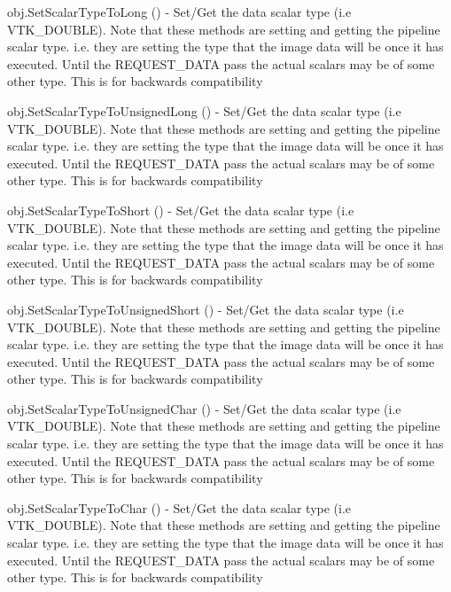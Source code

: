 \begin{DoxyItemize}
\item {\ttfamily obj.\-Set\-Scalar\-Type\-To\-Long ()} -\/ Set/\-Get the data scalar type (i.\-e V\-T\-K\-\_\-\-D\-O\-U\-B\-L\-E). Note that these methods are setting and getting the pipeline scalar type. i.\-e. they are setting the type that the image data will be once it has executed. Until the R\-E\-Q\-U\-E\-S\-T\-\_\-\-D\-A\-T\-A pass the actual scalars may be of some other type. This is for backwards compatibility  
\item {\ttfamily obj.\-Set\-Scalar\-Type\-To\-Unsigned\-Long ()} -\/ Set/\-Get the data scalar type (i.\-e V\-T\-K\-\_\-\-D\-O\-U\-B\-L\-E). Note that these methods are setting and getting the pipeline scalar type. i.\-e. they are setting the type that the image data will be once it has executed. Until the R\-E\-Q\-U\-E\-S\-T\-\_\-\-D\-A\-T\-A pass the actual scalars may be of some other type. This is for backwards compatibility  
\item {\ttfamily obj.\-Set\-Scalar\-Type\-To\-Short ()} -\/ Set/\-Get the data scalar type (i.\-e V\-T\-K\-\_\-\-D\-O\-U\-B\-L\-E). Note that these methods are setting and getting the pipeline scalar type. i.\-e. they are setting the type that the image data will be once it has executed. Until the R\-E\-Q\-U\-E\-S\-T\-\_\-\-D\-A\-T\-A pass the actual scalars may be of some other type. This is for backwards compatibility  
\item {\ttfamily obj.\-Set\-Scalar\-Type\-To\-Unsigned\-Short ()} -\/ Set/\-Get the data scalar type (i.\-e V\-T\-K\-\_\-\-D\-O\-U\-B\-L\-E). Note that these methods are setting and getting the pipeline scalar type. i.\-e. they are setting the type that the image data will be once it has executed. Until the R\-E\-Q\-U\-E\-S\-T\-\_\-\-D\-A\-T\-A pass the actual scalars may be of some other type. This is for backwards compatibility  
\item {\ttfamily obj.\-Set\-Scalar\-Type\-To\-Unsigned\-Char ()} -\/ Set/\-Get the data scalar type (i.\-e V\-T\-K\-\_\-\-D\-O\-U\-B\-L\-E). Note that these methods are setting and getting the pipeline scalar type. i.\-e. they are setting the type that the image data will be once it has executed. Until the R\-E\-Q\-U\-E\-S\-T\-\_\-\-D\-A\-T\-A pass the actual scalars may be of some other type. This is for backwards compatibility  
\item {\ttfamily obj.\-Set\-Scalar\-Type\-To\-Char ()} -\/ Set/\-Get the data scalar type (i.\-e V\-T\-K\-\_\-\-D\-O\-U\-B\-L\-E). Note that these methods are setting and getting the pipeline scalar type. i.\-e. they are setting the type that the image data will be once it has executed. Until the R\-E\-Q\-U\-E\-S\-T\-\_\-\-D\-A\-T\-A pass the actual scalars may be of some other type. This is for backwards compatibility  

\end{DoxyItemize}

